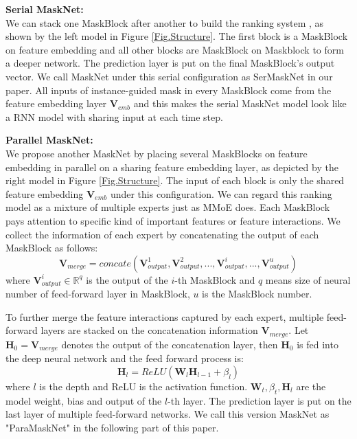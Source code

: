 \documentclass[sigconf]{acmart}
\begin{document}
\noindent\textbf{Serial MaskNet: }\\
\noindent We can stack one MaskBlock after another to build the ranking system , as shown by the left model in  Figure \ref{Fig.Structure}. The first block is a MaskBlock on feature embedding and all other blocks are MaskBlock on Maskblock to form a deeper network. The prediction layer is put on the final MaskBlock's output vector. We call MaskNet under this serial configuration as SerMaskNet in our paper. All  inputs of instance-guided mask in every MaskBlock come from the feature embedding layer $\mathbf{V}_{emb}$ and this makes the serial MaskNet model look like a RNN model with sharing input at each time step.

\noindent\textbf{Parallel MaskNet: }\\
\noindent We propose another MaskNet by placing  several MaskBlocks on feature embedding in parallel on a sharing feature embedding layer, as depicted by the right model in Figure \ref{Fig.Structure}. The input of each block is only the shared feature embedding $\mathbf{V}_{emb}$ under this configuration. We can regard this ranking model as a mixture of multiple experts  just as  MMoE\cite{ma2018modeling} does. Each MaskBlock pays attention to specific kind of important features or feature interactions. We collect the information of each expert by concatenating the output of each MaskBlock as follows:
\begin{equation}
  \mathbf{V}_{merge} = concate(\mathbf{V}^1_{output}, \mathbf{V}^2_{output},...,\mathbf{V}^i_{output},...,\mathbf{V}^u_{output})
\end{equation}
where $\mathbf{V}^i_{output} \in \mathbb{R}^q$ is the output of the $i$-th MaskBlock and $q$ means size of neural number of feed-forward layer in MaskBlock, $u$ is the MaskBlock number.


To further merge the feature interactions captured by each expert, multiple feed-forward layers are stacked on the concatenation information $\mathbf{V}_{merge}$. Let $\mathbf{H}_0 = \mathbf{V}_{merge}$ denotes the output of the concatenation layer, then $\mathbf{H}_0$ is fed into the deep neural network and the feed forward process is:
\begin{equation}
  \mathbf{H}_l = ReLU(\mathbf{W}_l\mathbf{H}_{l-1} + \beta_l)
\end{equation}
where $l$ is the depth and ReLU is the activation function. $\mathbf{W}_t, \beta_t, \mathbf{H}_l$ are the model weight, bias and output of the $l$-th layer. The prediction layer is put on the last layer of multiple feed-forward networks. We call this version MaskNet as "ParaMaskNet" in the following part of this paper.
\end{document}
